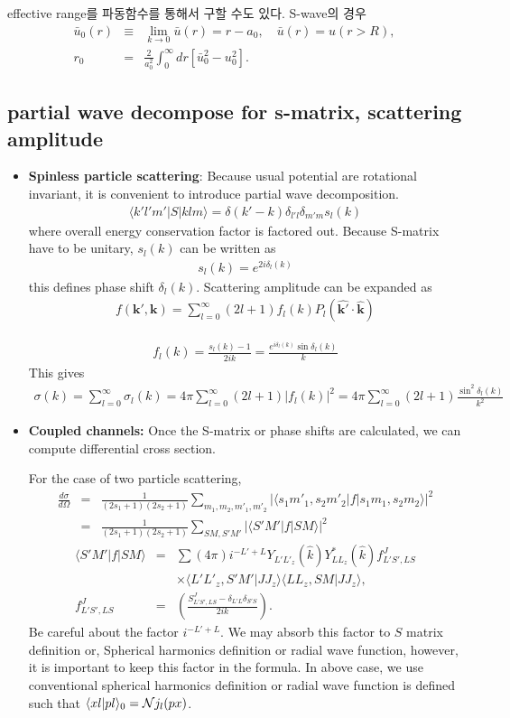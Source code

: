\documentclass[10pt]{article}
\def\bm{\boldsymbol}
\newcommand{\bea}{\begin{eqnarray}}
\newcommand{\eea}{\end{eqnarray}}
\newcommand{\no}{\nonumber \\}
\def\vk{{\bm k}}
\def\la{\langle}
\def\ra{\rangle}
\begin{document}
effective range를 파동함수를 통해서 구할 수도 있다. S-wave의 경우
\bea
\bar{u}_0(r)&\equiv& \lim_{k\to 0} \bar{u}(r)=r-a_0, \quad \bar{u}(r)=u(r>R),\no
r_0&=& \frac{2}{a_0^2}\int_0^\infty dr [\bar{u}_0^2-u_0^2].
\eea

\subsection{partial wave decompose for s-matrix, scattering amplitude}
\begin{itemize}

\item {\bf Spinless particle scattering}:
Because usual potential are rotational invariant, it is convenient to introduce partial wave
decomposition.
\bea
\la k' l' m'|S|klm\ra=\delta(k'-k)\delta_{l'l}\delta_{m'm}s_l(k)
\eea
where overall energy conservation factor is factored out. Because S-matrix have to be unitary,
$s_l(k)$ can be written as
\bea
s_l(k)=e^{2i\delta_l(k)}
\eea
this defines phase shift $\delta_l(k)$. Scattering amplitude can be expanded as
\bea
f(\vk',\vk)=\sum_{l=0}^\infty (2l+1) f_l(k)P_l(\hat{\vk'}\cdot\hat{\vk})
\eea

\bea
f_l(k)=\frac{s_l(k)-1}{2ik}=\frac{e^{i\delta_l(k)}\sin\delta_l(k)}{k}
\eea
This gives
\bea
\sigma(k)=\sum_{l=0}^\infty \sigma_l(k)=4\pi\sum_{l=0}^\infty (2l+1)|f_l(k)|^2
         =4\pi\sum_{l=0}^\infty (2l+1)\frac{\sin^2\delta_l(k)}{k^2}
\eea

\item {\bf Coupled channels:}
Once the S-matrix or phase shifts are calculated, we can compute
differential cross section.

For the case of two particle scattering,
\bea
\frac{d\sigma}{d\Omega}
&=&\frac{1}{(2s_1+1)(2s_2+1)}\sum_{m_1,m_2,m'_1,m'_2}
 |\la s_1 m'_1, s_2 m'_2|f|s_1 m_1,s_2 m_2\ra|^2\no 
&=&\frac{1}{(2s_1+1)(2s_2+1)}\sum_{S M, S' M'}
 |\la S' M'|f|S M\ra|^2 
\eea
\bea
\la S' M'|f|S M\ra
&=&\sum (4\pi)i^{-L'+L} Y_{L' L'_z}(\hat{k}) Y^*_{L L_z}(\hat{k})
        f^{J}_{L' S',LS}\no
        & &\times \la L' L'_z, S' M'| J J_z\ra
        \la L L_z, S M| J J_z\ra,\no
f^{J}_{L' S',LS}&=&
        \left(\frac{S^J_{L' S',LS}-\delta_{L'L}\delta_{S'S}}{2i k}\right).
\eea
Be careful about the factor $i^{-L'+L}$. We may absorb this factor 
to $S$ matrix definition or, Spherical harmonics definition or
radial wave function, however,
it is important to 
keep this factor in the formula. 
In above case, we use conventional spherical harmonics definition or
radial wave function is defined such that $\la x l|p l\ra_0={\cal N}j_{l}(px)$.



\end{itemize}
\end{document}
